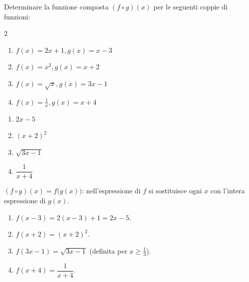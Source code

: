 \begin{question}[ID=5.1, subtitle={Funzione composta $(f\circ g)(x)$ — serie 1}, difficulty=media, tags={funzioni,composte}]
Determinare la funzione composta \( (f\circ g)(x) \) per le seguenti coppie di funzioni:

\begin{center}\begin{minipage}{0.92\linewidth}
\begin{multicols}{2}
\begin{enumerate}[leftmargin=3.2cm]
\item $f(x)=2x+1, g(x)=x-3$
\item $f(x)=x^2, g(x)=x+2$
\item $f(x)=\sqrt{x}, g(x)=3x-1$
\item $f(x)=\frac{1}{x}, g(x)=x+4$
\end{enumerate}
\end{multicols}
\end{minipage}\end{center}
\begin{solution}
\begin{enumerate}
    \item $2x-5$
    \item $(x+2)^2$
    \item $\sqrt{3x-1}$
    \item $\dfrac{1}{x+4}$
\end{enumerate}
\end{solution}
\begin{explanation}
$(f\circ g)(x)=f\big(g(x)\big)$: nell'espressione di $f$ si sostituisce ogni $x$ con l'intera espressione di $g(x)$.
\begin{enumerate}
    \item $f(x-3)=2(x-3)+1=2x-5$.
    \item $f(x+2)=(x+2)^2$.
    \item $f(3x-1)=\sqrt{3x-1}$ (definita per $x\geq\tfrac13$).
    \item $f(x+4)=\dfrac{1}{x+4}$.
\end{enumerate}
\end{explanation}
\end{question}


